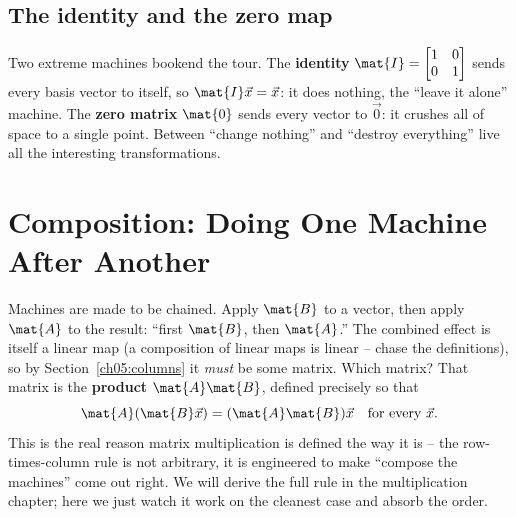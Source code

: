 \subsection{The identity and the zero map}
\label{ch05:identity-zero}

Two extreme machines bookend the tour. The \textbf{identity}
$\mat{I} = \begin{bmatrix} 1 & 0 \\ 0 & 1\end{bmatrix}$ sends every basis vector
to itself, so $\mat{I}\vec{x} = \vec{x}$: it does nothing, the ``leave it alone''
machine. The \textbf{zero matrix} $\mat{0}$ sends every vector to $\vec{0}$: it
crushes all of space to a single point. Between ``change nothing'' and ``destroy
everything'' live all the interesting transformations.

\section{Composition: Doing One Machine After Another}
\label{ch05:composition}

Machines are made to be chained. Apply $\mat{B}$ to a vector, then apply $\mat{A}$
to the result: ``first $\mat{B}$, then $\mat{A}$.'' The combined effect is itself
a linear map (a composition of linear maps is linear -- chase the definitions),
so by Section~\ref{ch05:columns} it \emph{must} be some matrix. Which matrix?
That matrix is the \textbf{product} $\mat{A}\mat{B}$, defined precisely so that
\[
  \mat{A}(\mat{B}\vec{x}) = (\mat{A}\mat{B})\vec{x} \quad\text{for every } \vec{x}.
\]
This is the real reason matrix multiplication is defined the way it is -- the row-
times-column rule is not arbitrary, it is engineered to make ``compose the
machines'' come out right. We will derive the full rule in the multiplication
chapter; here we just watch it work on the cleanest case and absorb the order.

